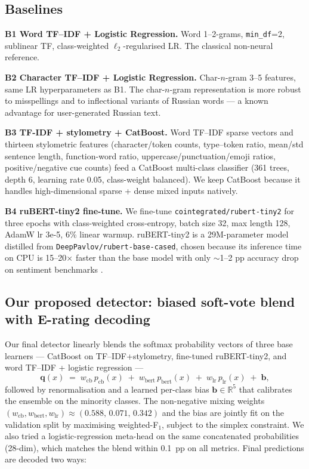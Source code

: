 \documentclass[11pt]{article}
\begin{document}
\subsection{Baselines}

\textbf{B1 Word TF--IDF + Logistic Regression.} Word 1--2-grams,
\texttt{min\_df}=2, sublinear TF, class-weighted $\ell_2$-regularised
LR. The classical non-neural reference.

\noindent\textbf{B2 Character TF--IDF + Logistic Regression.} Char-$n$-gram
3--5 features, same LR hyperparameters as B1. The char-$n$-gram
representation is more robust to misspellings and to inflectional variants
of Russian words --- a known advantage for user-generated Russian text.

\noindent\textbf{B3 TF-IDF + stylometry + CatBoost.} Word TF--IDF sparse vectors
and thirteen stylometric features (character/token counts, type--token ratio,
mean/std sentence length, function-word ratio, uppercase/punctuation/emoji
ratios, positive/negative cue counts) feed a CatBoost multi-class classifier
(361 trees, depth 6, learning rate 0.05, class-weight balanced). We keep
CatBoost because it handles high-dimensional sparse + dense mixed inputs
natively.

\noindent\textbf{B4 ruBERT-tiny2 fine-tune.} We fine-tune
\texttt{cointegrated/rubert-tiny2} for three epochs with
class-weighted cross-entropy, batch size 32, max length 128, AdamW
lr 3e-5, 6\% linear warmup. ruBERT-tiny2 is a 29M-parameter model
distilled from \texttt{DeepPavlov/rubert-base-cased}, chosen because its
inference time on CPU is 15--20$\times$ faster than the base model with
only $\sim$1--2 pp accuracy drop on sentiment benchmarks
\citep{dale2021rubert_tiny2}.

\subsection{Our proposed detector: biased soft-vote blend with E-rating decoding}

Our final detector linearly blends the softmax probability vectors of three
base learners --- CatBoost on TF--IDF+stylometry, fine-tuned ruBERT-tiny2,
and word TF--IDF + logistic regression ---
\[
\mathbf{q}(x) \;=\; w_\text{cb}\,p_\text{cb}(x) \;+\; w_\text{bert}\,p_\text{bert}(x) \;+\; w_\text{lr}\,p_\text{lr}(x)
\;+\; \mathbf{b},
\]
followed by renormalisation and a learned per-class bias $\mathbf{b}\in\mathbb{R}^5$
that calibrates the ensemble on the minority classes. The non-negative mixing
weights $(w_\text{cb}, w_\text{bert}, w_\text{lr}) \approx (0.588,\,0.071,\,0.342)$
and the bias are jointly fit on the validation split by maximising weighted-F$_1$,
subject to the simplex constraint. We also tried a logistic-regression
meta-head on the same concatenated probabilities (28-dim), which matches
the blend within 0.1~pp on all metrics. Final predictions are decoded two ways:
\end{document}
